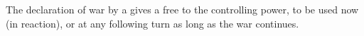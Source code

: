 The declaration of war by a \VASSAL gives a free \CB to the controlling power,
to be used now (in reaction), or at any following turn as long as the war
continues.

